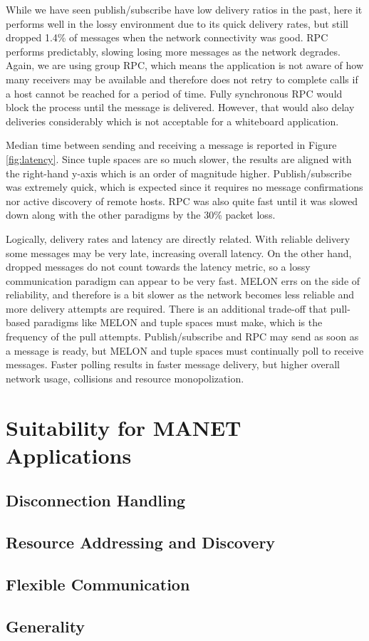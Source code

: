 While we have seen publish/subscribe have low delivery ratios in the past\cite{collins2010quantitative}, here it performs well in the lossy environment due to its quick delivery rates, but still dropped 1.4\% of messages when the network connectivity was good. RPC performs predictably, slowing losing more messages as the network degrades. Again, we are using group RPC, which means the application is not aware of how many receivers may be available and therefore does not retry to complete calls if a host cannot be reached for a period of time. Fully synchronous RPC would block the process until the message is delivered. However, that would also delay deliveries considerably which is not acceptable for a whiteboard application.

Median time between sending and receiving a message is reported in Figure \ref{fig:latency}. Since tuple spaces are so much slower, the results are aligned with the right-hand y-axis which is an order of magnitude higher. Publish/subscribe was extremely quick, which is expected since it requires no message confirmations nor active discovery of remote hosts. RPC was also quite fast until it was slowed down along with the other paradigms by the 30\% packet loss.

Logically, delivery rates and latency are directly related. With reliable delivery some messages may be very late, increasing overall latency. On the other hand, dropped messages do not count towards the latency metric, so a lossy communication paradigm can appear to be very fast. MELON errs on the side of reliability, and therefore is a bit slower as the network becomes less reliable and more delivery attempts are required. There is an additional trade-off that pull-based paradigms like MELON and tuple spaces must make, which is the frequency of the pull attempts. Publish/subscribe and RPC may send as soon as a message is ready, but MELON and tuple spaces must continually poll to receive messages. Faster polling results in faster message delivery, but higher overall network usage, collisions and resource monopolization.

\section{Suitability for MANET Applications}

\subsection{Disconnection Handling}

\subsection{Resource Addressing and Discovery}

\subsection{Flexible Communication}

\subsection{Generality}
